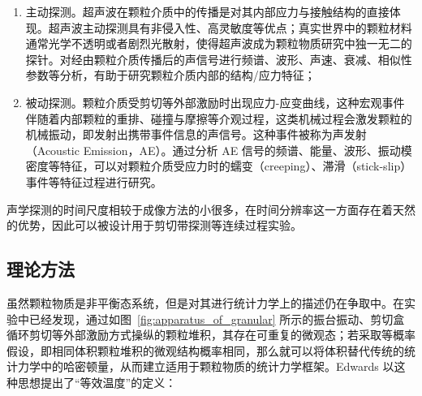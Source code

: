 \begin{enumerate}
  \item 主动探测。超声波在颗粒介质中的传播是对其内部应力与接触结构的直接体现\cite{PhysRevB.48.15646,Jia1999UltrasoundPI,Transitional}。超声波主动探测具有非侵入性、高灵敏度等优点；真实世界中的颗粒材料通常光学不透明或者剧烈光散射，使得超声波成为颗粒物质研究中独一无二的探针。对经由颗粒介质传播后的声信号进行频谱、波形、声速、衰减、相似性参数等分析，有助于研究颗粒介质内部的结构/应力特征；
  \item 被动探测。颗粒介质受剪切等外部激励时出现应力-应变曲线，这种宏观事件伴随着内部颗粒的重排、碰撞与摩擦等介观过程，这类机械过程会激发颗粒的机械振动，即发射出携带事件信息的声信号。这种事件被称为声发射（Acoustic Emission，AE）。通过分析 AE 信号的频谱、能量、波形、振动模密度等特征\cite{PhysRevLett.120.218003,10.1029/2023JB026612,doi:10.1073/pnas.2305134120}，可以对颗粒介质受应力时的蠕变（creeping）、滞滑（stick-slip）事件等特征过程进行研究。
\end{enumerate}

声学探测的时间尺度相较于成像方法的小很多，在时间分辨率这一方面存在着天然的优势\cite{PhysRevE.84.020301}，因此可以被设计用于剪切带探测\cite{PhysRevE.85.051302}等连续过程实验。


\subsection{理论方法}

虽然颗粒物质是非平衡态系统，但是对其进行统计力学上的描述仍在争取中。在实验中已经发现，通过如图~\eqref{fig:apparatus_of_granular} 所示的振台振动、剪切盒循环剪切等外部激励方式操纵的颗粒堆积，其存在可重复的微观态；若采取等概率假设，即相同体积颗粒堆积的微观结构概率相同，那么就可以将体积替代传统的统计力学中的哈密顿量，从而建立适用于颗粒物质的统计力学框架。Edwards 以这种思想提出了“等效温度”的定义\cite{EDWARDS19891080}：

